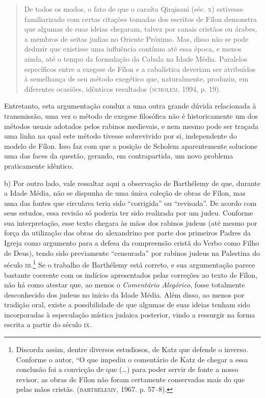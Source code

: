 \begin{quote}
De todos os modos, o fato de que o caraíta Qirqisani (séc. \textsc{x})
estivesse familiarizado com certas citações tomadas dos escritos de
Fílon demonstra que algumas de suas ideias chegaram, talvez por
canais cristãos ou árabes, a membros de seitas judias no Oriente
Próximo. Mas, disso não se pode deduzir que existisse uma influência
contínua até essa época, e menos ainda, até o tempo da formulação da
Cabala na Idade Média. Paralelos específicos entre a exegese de Fílon
e a cabalística deveriam ser atribuídos à semelhança de seu método
exegético que, naturalmente, produziu, em diferentes ocasiões,
idênticos resultados (\textsc{scholem}, 1994, p. 19).
\end{quote}

Entretanto, esta argumentação conduz a uma outra grande dúvida
relacionada à transmissão, uma vez o método de exegese filosófica não
é historicamente um dos métodos usuais adotados pelos rabinos
medievais, e nem mesmo pode ser traçada uma linha na qual este método
tivesse sobrevivido por si, independente do modelo de Fílon. Isso faz
com que a posição de Scholem aparentemente solucione uma das faces da
questão, gerando, em contrapartida, um novo problema praticamente
idêntico.

b) Por outro lado, vale ressaltar aqui a observação de Barthélemy de
que, durante a Idade Média, não se dispunha de uma única coleção de
obras de Fílon, mas uma das fontes que circulava teria sido
“corrigida” ou “revisada”. De acordo com seus estudos, essa revisão
só poderia ter sido realizada por um judeu. Conforme sua
interpretação, esse texto chegara às mãos dos rabinos judeus (até
mesmo por força da utilização das obras do alexandrino por parte dos
primeiros Padres da Igreja como argumento para a defesa da
compreensão cristã do Verbo como Filho de Deus), tendo sido
previamente “censurada” por rabinos judeus na Palestina do século
\textsc{iii}.\footnote{ Discorda assim, dentre diversos estudiosos, de Katz que
defende o inverso. Conforme o autor, “O que impediu o comentário de
Katz de chegar a essa conclusão foi a convicção de que (\ldots{}) para
poder servir de fonte a nosso revisor, as obras de Fílon não foram
certamente conservadas mais do que pelas mãos cristãs.
(\textsc{barthélemy},
1967. p. 57--8).} Se o trabalho de Barthélemy está correto, e sua
argumentação parece bastante coerente com os indícios apresentados
pelas correções ao texto de Fílon, não há como atestar que, ao menos
o \emph{Comentário Alegórico}, fosse totalmente desconhecido dos
judeus no início da Idade Média. Além disso, ao menos por tradição
oral, existe a possibilidade de que algumas de suas ideias tenham
sido incorporadas à especulação mística judaica posterior, vindo a
ressurgir na forma escrita a partir do século \textsc{ix}. 

